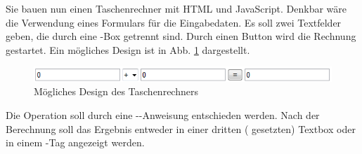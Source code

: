 %
\par Sie bauen nun einen Taschenrechner mit HTML und JavaScript. Denkbar wäre
die Verwendung eines Formulars für die Eingabedaten. Es soll zwei Textfelder
geben, die durch eine -Box getrennt sind. Durch einen Button wird
die Rechnung gestartet. Ein mögliches Design ist in Abb. \ref{fig:calculator}
dargestellt.
%
\begin{figure}[!h]
\centering
\includegraphics{Exercises/Figures/calculator.png}
\caption{Mögliches Design des Taschenrechners}
\label{fig:calculator}
\end{figure}
%
\par Die Operation soll durch eine --Anweisung
entschieden werden. Nach der Berechnung soll das Ergebnis entweder in einer
dritten ( gesetzten) Textbox oder in einem -Tag
angezeigt werden.